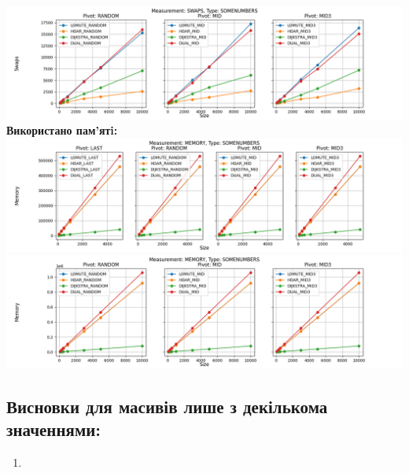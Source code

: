 \documentclass{article}
\begin{document}
        \includegraphics[scale=0.5]{somenumbers_Swaps_3_pivots_7_numbers.png}
        \newline
    \newpage
    \textbf{Використано пам’ятi:}
    \newline
        \includegraphics[scale=0.5]{somenumbers_Memory_6_numbers.png}
        \includegraphics[scale=0.5]{somenumbers_Memory_3_pivots_7_numbers.png}
    \subsection{Висновки для масивів лише з декількома значеннями:}
    \begin{enumerate}
        \item 
    \end{enumerate}
    \newpage

\end{document}

